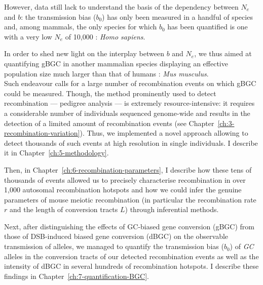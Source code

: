 However, data still lack to understand the basis of the dependency between $N_e$ and $b$: the transmission bias ($b_0$) has only been measured in a handful of species \citep{mancera2008highresolution, si2015widely, williams2015noncrossover, halldorsson2016rate, keith2016high, smeds2016highresolution} and, among mammals, the only species for which $b_0$ has been quantified is one with a very low $N_e$ of 10,000 \citep{takahata1993allelic,erlich1996hla,harding1997archaic,charlesworth2009fundamental,yu2004nucleotide}: \textit{Homo sapiens}.


In order to shed new light on the interplay between $b$ and $N_e$, we thus aimed at quantifying gBGC in another mammalian species displaying an effective population size much larger than that of humans \citep{geraldes2008inferring,phifer-rixey2012adaptive,davies2015factors}: \textit{Mus musculus}.\\

Such endeavour calls for a large number of recombination events on which gBGC could be measured. 
Though, the method prominently used to detect recombination — pedigree analysis — is extremely resource-intensive: it requires a considerable number of individuals sequenced genome-wide and results in the detection of a limited amount of recombination events (see Chapter~\ref{ch:3-recombination-variation}).
Thus, we implemented a novel approach allowing to detect thousands of such events at high resolution in single individuals. I describe it in Chapter~\ref{ch:5-methodology}.

Then, in Chapter~\ref{ch:6-recombination-parameters}, I describe how these tens of thousands of events allowed us to precisely characterise recombination in over 1,000 autosomal recombination hotspots and how we could infer the genuine parameters of mouse meiotic recombination (in particular the recombination rate $r$ and the length of conversion tracts $L$) through inferential methods.

Next, after distinguishing the effects of GC-biased gene conversion (gBGC) from those of DSB-induced biased gene conversion (dBGC) on the observable transmission of alleles, we managed to quantify the transmission bias ($b_0$) of \textit{GC} alleles in the conversion tracts of our detected recombination events as well as the intensity of dBGC in several hundreds of recombination hotspots. 
I describe these findings in Chapter~\ref{ch:7-quantification-BGC}.

